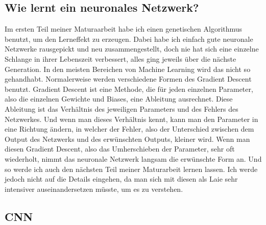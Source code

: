 \documentclass[10pt,a4paper,ngerman,english]{article}
\begin{document}
\subsection{Wie lernt ein neuronales Netzwerk?}

Im ersten Teil meiner Maturaarbeit habe ich einen genetischen Algorithmus benutzt, um den Lerneffekt zu erzeugen. Dabei habe ich einfach gute neuronale Netzwerke rausgepickt und neu zusammengestellt, doch nie hat sich eine einzelne Schlange in ihrer Lebenszeit verbessert, alles ging jeweils über die nächste Generation. In den meisten Bereichen von Machine Learning wird das nicht so gehandhabt. Normalerweise werden verschiedene Formen des Gradient Descent benutzt. Gradient Descent ist eine Methode, die für jeden einzelnen Parameter, also die einzelnen Gewichte und Biases, eine Ableitung ausrechnet. Diese Ableitung ist das Verhältnis des jeweiligen Parameters und des Fehlers des Netzwerkes. Und wenn man dieses Verhältnis kennt, kann man den Parameter in eine Richtung ändern, in welcher der Fehler, also der Unterschied zwischen dem Output des Netzwerks und des erwünschten Outputs, kleiner wird. Wenn man diesen Gradient Descent, also das Umherschieben der Parameter, sehr oft wiederholt, nimmt das neuronale Netzwerk langsam die erwünschte Form an. Und so werde ich auch den nächsten Teil meiner Maturarbeit lernen lassen. Ich werde jedoch nicht auf die Details eingehen, da man sich mit diesen als Laie sehr intensiver auseinandersetzen müsste, um es zu verstehen.

\subsection{CNN}
\end{document}
